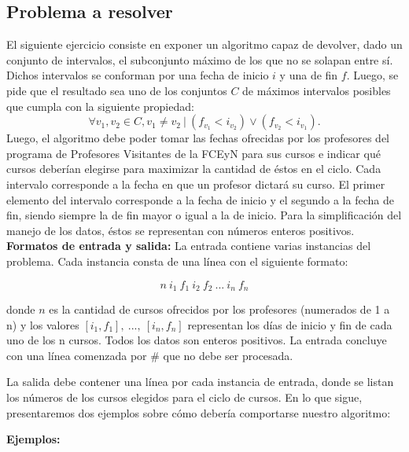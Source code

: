 \subsection{Problema a resolver}
El siguiente ejercicio consiste en exponer un algoritmo capaz de devolver, dado un conjunto de intervalos, el subconjunto máximo de los que no se solapan entre sí. Dichos intervalos se conforman por una fecha de inicio $i$ y una de fin $f$. Luego, se pide que el resultado sea uno de los conjuntos $C$ de máximos intervalos posibles que cumpla con la siguiente propiedad: $$\forall v_{1}, v_{2} \in C, v_{1} \neq v_{2}\ | \ (f_{v_{1}} < i_{v_{2}}) \vee (f_{v_{2}} < i_{v_{1}}).$$ Luego, el algoritmo debe poder tomar las fechas ofrecidas por los profesores del programa de Profesores Visitantes de la FCEyN para sus cursos e indicar qué cursos deberían elegirse para maximizar la cantidad de éstos en el ciclo. Cada intervalo corresponde a la fecha en que un profesor dictará su curso. El primer elemento del intervalo corresponde a la fecha de inicio y el segundo a la fecha de fin, siendo siempre la de fin mayor o igual a la de inicio. Para la simplificación del manejo de los datos, éstos se representan con números enteros positivos.\newline
\newline
\textbf {Formatos de entrada y salida:}\newline
\newline
La entrada contiene varias instancias del problema. Cada instancia consta de una línea con el siguiente formato:

$$n\ i_{1}\ f_{1}\ i_{2}\ f_{2}\ ...\ i_{n}\ f_{n}$$


donde \textbf{$n$} es la cantidad de cursos ofrecidos por los profesores (numerados de 1 a n) y los valores \textbf{$[i_{1},f_{1}],\ ...,\ [i_{n},f_{n}]$} representan los días de inicio y fin de cada uno de los n cursos. Todos los datos son enteros positivos. La entrada concluye con una línea comenzada por \# que no debe ser procesada.\newline

La salida debe contener una línea por cada instancia de entrada, donde se listan los números de los cursos elegidos para el ciclo de cursos.\newline
\newline
En lo que sigue, presentaremos dos ejemplos sobre cómo debería comportarse nuestro algoritmo:\newline

{\large{\textbf{Ejemplos:}}}\newline

